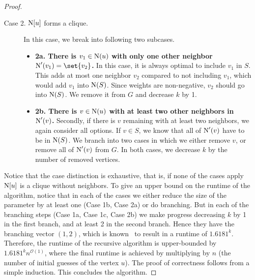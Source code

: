 \begin{lemma}
\begin{proof}
\begin{description}
    \item[Case 2. $\operatorname{N}[{u}]$ forms a clique.] In this case, we break into following two subcases.
    \begin{itemize}
        \item \label{it:clique4}\textbf{2a. There is $v_1 \in \operatorname{N}({u})$ with only one other neighbor $\neiOp'(v_1) = \set{v_2}$.} In this case, it is always optimal to include $v_1$ in $S$. This adds at most one neighbor $v_2$ compared to not including $v_1$, which would add $v_1$ into $\operatorname{N}({S})$. Since weights are non-negative, $v_2$ should go into $\operatorname{N}({S})$. We remove it from $G$ and decrease $k$ by 1.
        
        \item \label{it:clique5}\textbf{2b. There is $v \in \operatorname{N}({u})$ with at least two other neighbors in $\operatorname{N}'(v)$.} Secondly, if there is $v$ remaining with at least two neighbors, we again consider all options.
        If $v \in S$, we know that all of $\operatorname{N}'(v)$ have to be in $\operatorname{N}({S})$. We branch into two cases in which we either remove $v$, or remove all of $\operatorname{N}'(v)$ from $G$. In both cases, we decrease $k$ by the number of removed vertices.
    \end{itemize}
\end{description}

Notice that the case distinction is exhaustive, that is, if none of the cases apply $\operatorname{N}[{u}]$ is a clique without neighbors.
To give an upper bound on the runtime of the algorithm, notice that in each of the cases we either reduce the size of the parameter by at least one (Case 1b, Case 2a) or do branching. But in each of the branching steps (Case 1a, Case 1c, Case 2b) we make progress decreasing $k$ by 1 in the first branch, and at least 2 in the second branch. Hence they have the branching vector $(1,2)$, which is known~\cite[Chapter 3]{cygan2015parameterized} to result in a runtime of $1.6181^k$.  Therefore, the runtime of the recursive algorithm is upper-bounded by $1.6181^k n^{\mathcal{O}(1)}$, where the final runtime is achieved by multiplying by $n$ (the number of initial guesses of the vertex $u$). The proof of correctness follows from a simple induction. This concludes the algorithm. 
\end{proof}
\fi


\begin{comment}
\subsection{Restricted Secluded Subgraphs in \texorpdfstring{$\alpha$}{α}-Bounded Graphs}\label{sec:restricted}


\end{comment}
\end{lemma}
